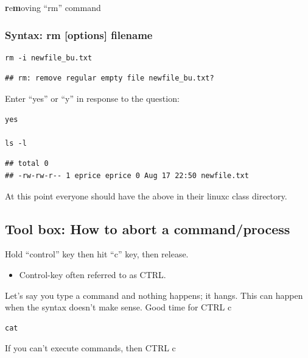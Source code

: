 \documentclass[
]{book}
\providecommand{\tightlist}{%
  \setlength{\itemsep}{0pt}\setlength{\parskip}{0pt}}
\begin{document}
\textbf{r}e\textbf{m}oving ``rm'' command

\hypertarget{syntax-rm-options-filename}{%
\subsubsection*{Syntax: rm {[}options{]} filename}\label{syntax-rm-options-filename}}

\begin{verbatim}
rm -i newfile_bu.txt
\end{verbatim}

\begin{verbatim}
## rm: remove regular empty file newfile_bu.txt?
\end{verbatim}

Enter ``yes'' or ``y'' in response to the question:

\begin{verbatim}
yes

ls -l
\end{verbatim}

\begin{verbatim}
## total 0
## -rw-rw-r-- 1 eprice eprice 0 Aug 17 22:50 newfile.txt
\end{verbatim}

At this point everyone should have the above in their linuxc class directory.

\hypertarget{tool-box-how-to-abort-a-commandprocess}{%
\subsection{Tool box: How to abort a command/process}\label{tool-box-how-to-abort-a-commandprocess}}

Hold ``control'' key then hit ``c'' key, then release.

\begin{itemize}
\tightlist
\item
  Control-key often referred to as CTRL.
\end{itemize}

Let's say you type a command and nothing happens; it hangs.
This can happen when the syntax doesn't make sense.
Good time for CTRL c

\begin{verbatim}
cat
\end{verbatim}

If you can't execute commands, then CTRL c
\end{document}
